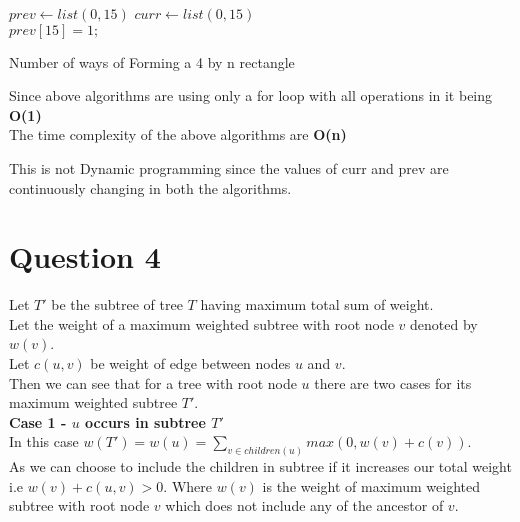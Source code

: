 \documentclass{report}
\begin{document}
 \begin{algorithm}[H]
    $prev \longleftarrow list(0,15)$ 
    $curr \longleftarrow list(0,15)$\\
    $prev[15]=1;$ 
     \caption{Number of ways of Forming a 4 by n rectangle}
 \end{algorithm}

 Since above algorithms are using only a for loop with all operations in it being \textbf{O(1)}\\
 The time complexity of the above algorithms are \textbf{O(n)}
 
 This is not Dynamic programming since the values of curr and prev are continuously changing in both the algorithms.\\
 
 \newpage
 \section*{Question 4}
 Let $T'$ be the subtree of tree $T$ having maximum total sum of weight.\\
 Let the weight of a maximum weighted subtree with root node $v$ denoted by $w(v)$.\\
 Let $c(u,v)$ be weight of edge between nodes $u$ and $v$.\\
 Then we can see that for a tree with root node $u$ there are two cases for its maximum weighted subtree $T'$.\\
 
 \textbf{Case 1 -  $u$ occurs in subtree $T'$}\\
 In this case $w(T') = w(u) = \sum\limits_{v \in children(u)} max(0,w(v)+c(v))$.\\
 As we can choose to include the children in subtree if it increases our total weight i.e $w(v) + c(u,v) > 0$. Where $w(v)$ is the weight of maximum weighted subtree with root node $v$ which does not include any of the ancestor of $v$.\\ 
 
\end{document}
